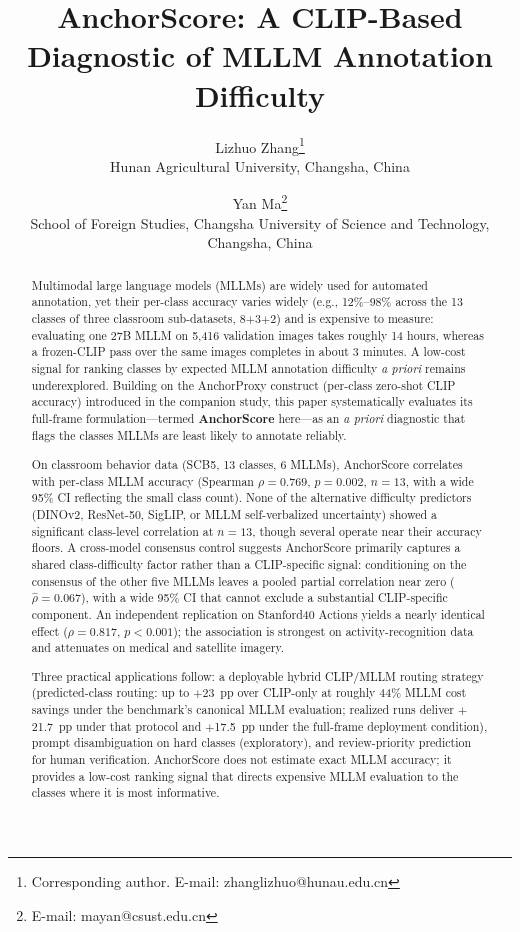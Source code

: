 \documentclass[11pt,a4paper]{article}
\begin{document}
\title{AnchorScore: A CLIP-Based Diagnostic of MLLM Annotation Difficulty}

\author{Lizhuo Zhang\thanks{Corresponding author. E-mail: zhanglizhuo@hunau.edu.cn} \\
  \small Hunan Agricultural University, Changsha, China
\and
Yan Ma\thanks{E-mail: mayan@csust.edu.cn} \\
  \small School of Foreign Studies, Changsha University of Science and Technology, Changsha, China}

\begin{abstract}
Multimodal large language models (MLLMs) are widely used for automated annotation, yet their per-class accuracy varies widely (e.g., 12\%--98\% across the 13 classes of three classroom sub-datasets, 8$+$3$+$2) and is expensive to measure: evaluating one 27B MLLM on 5{,}416 validation images takes roughly 14 hours, whereas a frozen-CLIP pass over the same images completes in about 3 minutes. A low-cost signal for ranking classes by expected MLLM annotation difficulty \emph{a priori} remains underexplored. Building on the AnchorProxy construct (per-class zero-shot CLIP accuracy) introduced in the companion study, this paper systematically evaluates its full-frame formulation---termed \textbf{AnchorScore} here---as an \emph{a priori} diagnostic that flags the classes MLLMs are least likely to annotate reliably.

On classroom behavior data (SCB5, 13 classes, 6 MLLMs), AnchorScore correlates with per-class MLLM accuracy (Spearman $\rho=0.769$, $p=0.002$, $n=13$, with a wide 95\% CI reflecting the small class count). None of the alternative difficulty predictors (DINOv2, ResNet-50, SigLIP, or MLLM self-verbalized uncertainty) showed a significant class-level correlation at $n=13$, though several operate near their accuracy floors. A cross-model consensus control suggests AnchorScore primarily captures a shared class-difficulty factor rather than a CLIP-specific signal: conditioning on the consensus of the other five MLLMs leaves a pooled partial correlation near zero ($\hat{\rho}=0.067$), with a wide 95\% CI that cannot exclude a substantial CLIP-specific component. An independent replication on Stanford40 Actions yields a nearly identical effect ($\rho=0.817$, $p<0.001$); the association is strongest on activity-recognition data and attenuates on medical and satellite imagery.

Three practical applications follow: a deployable hybrid CLIP/MLLM routing strategy (predicted-class routing: up to $+$23~pp over CLIP-only at roughly 44\% MLLM cost savings under the benchmark's canonical MLLM evaluation; realized runs deliver $+$21.7~pp under that protocol and $+$17.5~pp under the full-frame deployment condition), prompt disambiguation on hard classes (exploratory), and review-priority prediction for human verification. AnchorScore does not estimate exact MLLM accuracy; it provides a low-cost ranking signal that directs expensive MLLM evaluation to the classes where it is most informative.
\end{abstract}
\end{document}
